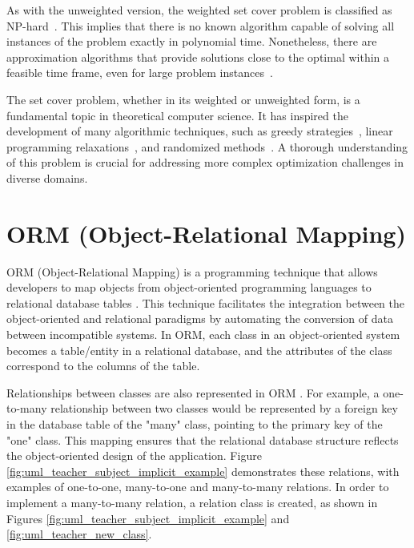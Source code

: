             As with the unweighted version, the weighted set cover problem is classified as NP-hard~\cite{garey1979computers}. This implies that there is no known algorithm capable of solving all instances of the problem exactly in polynomial time. Nonetheless, there are approximation algorithms that provide solutions close to the optimal within a feasible time frame, even for large problem instances~\cite{chvatal1979greedy}.

            The set cover problem, whether in its weighted or unweighted form, is a fundamental topic in theoretical computer science. It has inspired the development of many algorithmic techniques, such as greedy strategies~\cite{chvatal1979greedy}, linear programming relaxations~\cite{vazirani2001approximation}, and randomized methods~\cite{motwani1995randomized}. A thorough understanding of this problem is crucial for addressing more complex optimization challenges in diverse domains.



    \section{ORM (Object-Relational Mapping)} \label{sec:orm}

    ORM (Object-Relational Mapping) is a programming technique that allows developers to map objects from object-oriented programming languages to relational database tables \cite{ambler2002object}.
    This technique facilitates the integration between the object-oriented and relational paradigms by automating the conversion of data between incompatible systems.
    In ORM, each class in an object-oriented system becomes a table/entity in a relational database, and the attributes of the class correspond to the columns of the table.

    Relationships between classes are also represented in ORM \cite{fowler2003patterns}. For example, a one-to-many relationship between two classes would be represented by a foreign key in the database table of the "many" class, pointing to the primary key of the "one" class. This mapping ensures that the relational database structure reflects the object-oriented design of the application. Figure \ref{fig:uml_teacher_subject_implicit_example} demonstrates these relations, with examples of one-to-one, many-to-one and many-to-many relations. 
    In order to implement a many-to-many relation, a relation class is created, as shown in Figures \ref{fig:uml_teacher_subject_implicit_example} and \ref{fig:uml_teacher_new_class}.


